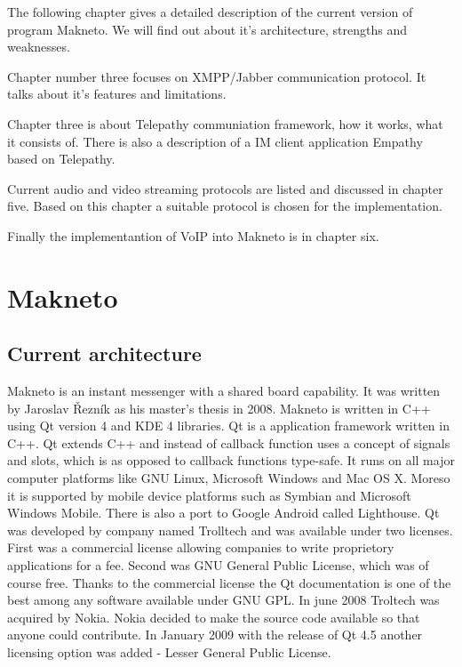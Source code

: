 The following chapter gives a detailed description of the current version of program Makneto. We will find out about it's architecture, strengths and weaknesses. 

Chapter number three focuses on XMPP/Jabber communication protocol. It talks about it's features and limitations. 

Chapter three is about Telepathy communiation framework, how it works, what it consists of. There is also a description of a IM client application Empathy based on Telepathy. 

Current audio and video streaming protocols are listed and discussed in chapter five. Based on this chapter a suitable protocol is chosen for the implementation.

Finally the implementantion of VoIP into Makneto is in chapter six.  


\chapter{Makneto}
\section{Current architecture}
Makneto is an instant messenger with a shared board capability. It was written by Jaroslav Řezník as his master's thesis in 2008. Makneto is written in C++ using Qt version 4 and KDE 4 libraries. Qt is a application framework written in C++. Qt extends C++ and instead of callback function uses a concept of signals and slots, which is as opposed to callback functions type-safe. It runs on all major computer platforms like GNU Linux, Microsoft Windows and Mac OS X. Moreso it is supported by mobile device platforms such as Symbian and Microsoft Windows Mobile. There is also a port to Google Android called Lighthouse. Qt was developed by company named Trolltech and was available under two licenses. First was a commercial license allowing companies to write proprietory applications for a fee. Second was GNU General Public License, which was of course free. Thanks to the commercial license the Qt documentation is one of the best among any software available under GNU GPL. In june 2008 Troltech was acquired by Nokia. Nokia decided to make the source code available so that anyone could contribute. In January 2009 with the release of Qt 4.5 another licensing option was added - Lesser General Public License.\cite{wikiQt}\cite{Qt}

